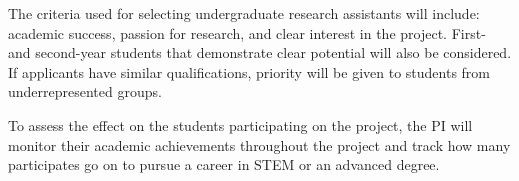 \documentclass[11pt]{article}
\begin{document}
    The criteria used for selecting undergraduate research assistants will include: academic success, passion for research, and clear interest in the project.
    First- and second-year students that demonstrate clear potential will also be considered.
    If applicants have similar qualifications, priority will be given to students from underrepresented groups.

    To assess the effect on the students participating on the project, the PI will monitor their academic achievements throughout the project and track how many participates go on to pursue a career in STEM or an advanced degree.
\end{document}
